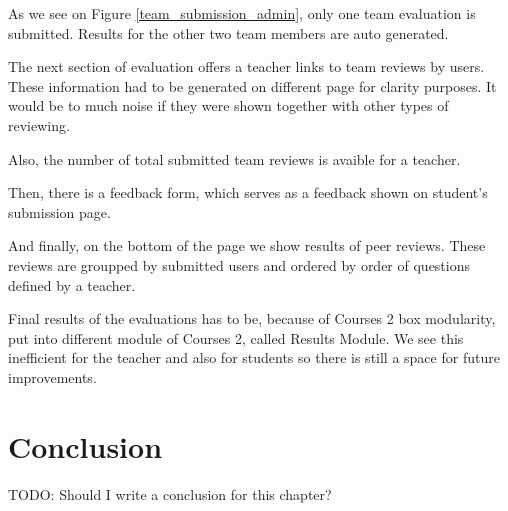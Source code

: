 As we see on Figure \ref{team_submission_admin}, only one team evaluation is submitted. Results for the other two team members are auto generated.

The next section of evaluation offers a teacher links to team reviews by users. These information had to be generated on different page for clarity purposes. It would be to much noise if they were shown together with other types of reviewing.

Also, the number of total submitted team reviews is avaible for a teacher.

Then, there is a feedback form, which serves as a feedback shown on student's submission page.

And finally, on the bottom of the page we show results of peer reviews. These reviews are groupped by submitted users and ordered by order of questions defined by a teacher.

Final results of the evaluations has to be, because of Courses 2 box modularity, put into different module of Courses 2, called Results Module. We see this inefficient for the teacher and also for students so there is still a space for future improvements.

\section{Conclusion}
TODO: Should I write a conclusion for this chapter?
